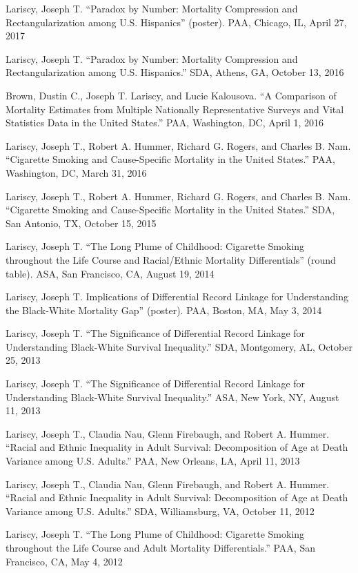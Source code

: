 \documentclass[11pt,]{article}
\begin{document}
Lariscy, Joseph T. ``Paradox by Number: Mortality Compression and
Rectangularization among U.S. Hispanics'' (poster). PAA, Chicago, IL,
April 27, 2017

Lariscy, Joseph T. ``Paradox by Number: Mortality Compression and
Rectangularization among U.S. Hispanics.'' SDA, Athens, GA, October 13,
2016

Brown, Dustin C., Joseph T. Lariscy, and Lucie Kalousova. ``A Comparison
of Mortality Estimates from Multiple Nationally Representative Surveys
and Vital Statistics Data in the United States.'' PAA, Washington, DC,
April 1, 2016

Lariscy, Joseph T., Robert A. Hummer, Richard G. Rogers, and Charles B.
Nam. ``Cigarette Smoking and Cause-Specific Mortality in the United
States.'' PAA, Washington, DC, March 31, 2016

Lariscy, Joseph T., Robert A. Hummer, Richard G. Rogers, and Charles B.
Nam. ``Cigarette Smoking and Cause-Specific Mortality in the United
States.'' SDA, San Antonio, TX, October 15, 2015

Lariscy, Joseph T. ``The Long Plume of Childhood: Cigarette Smoking
throughout the Life Course and Racial/Ethnic Mortality Differentials''
(round table). ASA, San Francisco, CA, August 19, 2014

Lariscy, Joseph T. Implications of Differential Record Linkage for
Understanding the Black-White Mortality Gap'' (poster). PAA, Boston, MA,
May 3, 2014

Lariscy, Joseph T. ``The Significance of Differential Record Linkage for
Understanding Black-White Survival Inequality.'' SDA, Montgomery, AL,
October 25, 2013

Lariscy, Joseph T. ``The Significance of Differential Record Linkage for
Understanding Black-White Survival Inequality.'' ASA, New York, NY,
August 11, 2013

Lariscy, Joseph T., Claudia Nau, Glenn Firebaugh, and Robert A. Hummer.
``Racial and Ethnic Inequality in Adult Survival: Decomposition of Age
at Death Variance among U.S. Adults.'' PAA, New Orleans, LA, April 11,
2013

Lariscy, Joseph T., Claudia Nau, Glenn Firebaugh, and Robert A. Hummer.
``Racial and Ethnic Inequality in Adult Survival: Decomposition of Age
at Death Variance among U.S. Adults.'' SDA, Williamsburg, VA, October
11, 2012

Lariscy, Joseph T. ``The Long Plume of Childhood: Cigarette Smoking
throughout the Life Course and Adult Mortality Differentials.'' PAA, San
Francisco, CA, May 4, 2012
\end{document}
